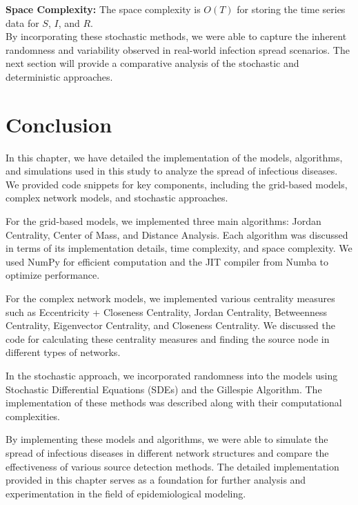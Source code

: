 \textbf{Space Complexity:} The space complexity is \(O(T)\) for storing the time series data for \(S\), \(I\), and \(R\).\\

By incorporating these stochastic methods, we were able to capture the inherent randomness and variability observed in real-world infection spread scenarios. The next section will provide a comparative analysis of the stochastic and deterministic approaches.

\section{Conclusion}
In this chapter, we have detailed the implementation of the models, algorithms, and simulations used in this study to analyze the spread of infectious diseases. We provided code snippets for key components, including the grid-based models, complex network models, and stochastic approaches. 

For the grid-based models, we implemented three main algorithms: Jordan Centrality, Center of Mass, and Distance Analysis. Each algorithm was discussed in terms of its implementation details, time complexity, and space complexity. We used NumPy for efficient computation and the JIT compiler from Numba to optimize performance.

For the complex network models, we implemented various centrality measures such as Eccentricity + Closeness Centrality, Jordan Centrality, Betweenness Centrality, Eigenvector Centrality, and Closeness Centrality. We discussed the code for calculating these centrality measures and finding the source node in different types of networks.

In the stochastic approach, we incorporated randomness into the models using Stochastic Differential Equations (SDEs) and the Gillespie Algorithm. The implementation of these methods was described along with their computational complexities.

By implementing these models and algorithms, we were able to simulate the spread of infectious diseases in different network structures and compare the effectiveness of various source detection methods. The detailed implementation provided in this chapter serves as a foundation for further analysis and experimentation in the field of epidemiological modeling.